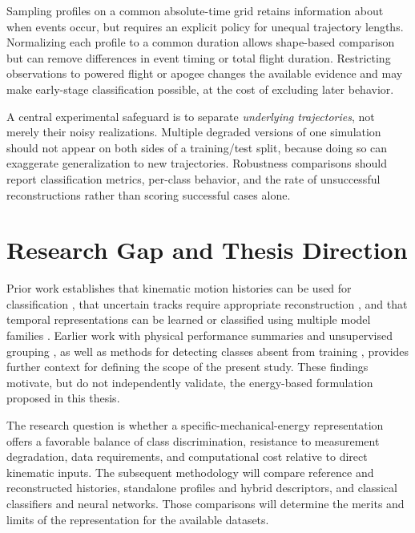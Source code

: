 Sampling profiles on a common absolute-time grid retains
information about when events occur, but requires an explicit
policy for unequal trajectory lengths. Normalizing each
profile to a common duration allows shape-based comparison
but can remove differences in event timing or total flight
duration. Restricting observations to powered flight or
apogee changes the available evidence and may make
early-stage classification possible, at the cost of
excluding later behavior.

A central experimental safeguard is to separate
\emph{underlying trajectories}, not merely their noisy
realizations. Multiple degraded versions of one simulation
should not appear on both sides of a training/test split,
because doing so can exaggerate generalization to new
trajectories. Robustness comparisons should report
classification metrics, per-class behavior, and the rate
of unsuccessful reconstructions rather than scoring
successful cases alone.

\section{Research Gap and Thesis Direction}
\label{sec:lit-gap}

Prior work establishes that kinematic motion histories can
be used for classification \cite{ristic2004kinematic,
singh2014dynamic,jochumsen2016recursive,
eckert2020classification,cervantes2024telemetry},
that uncertain tracks require appropriate reconstruction
\cite{barshalom2001estimation,rousseeuw1987robust,
eckert2020thesis,collins2025crud},
and that temporal representations can be learned or
classified using multiple model families
\cite{bagnall2017bakeoff,fawaz2019review,
gaubatz2025fda,dimaggio2026ensemble}.
Earlier work with physical performance summaries and
unsupervised grouping \cite{evans2026clustering},
as well as methods for detecting classes absent from
training \cite{dove2025novelty}, provides further
context for defining the scope of the present study.
These findings motivate, but do not independently validate,
the energy-based formulation proposed in this thesis.

The research question is whether a specific-mechanical-energy
representation offers a favorable balance of class
discrimination, resistance to measurement degradation,
data requirements, and computational cost relative
to direct kinematic inputs. The subsequent methodology
will compare reference and reconstructed histories,
standalone profiles and hybrid descriptors, and
classical classifiers and neural networks. Those
comparisons will determine the merits and limits
of the representation for the available datasets.

